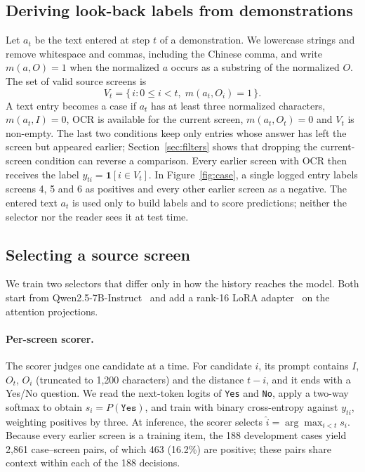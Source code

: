 \documentclass{article}
\begin{document}
\subsection{Deriving look-back labels from demonstrations}
\label{sec:labels}
Let $a_t$ be the text entered at step $t$ of a demonstration. We lowercase strings and remove whitespace and commas, including the Chinese comma, and write $m(a,O)=1$ when the normalized $a$ occurs as a substring of the normalized $O$. The set of valid source screens is
\[
V_t=\{\,i : 0\leq i<t,\; m(a_t,O_i)=1\,\}.
\]
A text entry becomes a case if $a_t$ has at least three normalized characters, $m(a_t,I)=0$, OCR is available for the current screen, $m(a_t,O_t)=0$ and $V_t$ is non-empty. The last two conditions keep only entries whose answer has left the screen but appeared earlier; Section~\ref{sec:filters} shows that dropping the current-screen condition can reverse a comparison. Every earlier screen with OCR then receives the label $y_{ti}=\mathbf{1}[i\in V_t]$. In Figure~\ref{fig:case}, a single logged entry labels screens 4, 5 and 6 as positives and every other earlier screen as a negative. The entered text $a_t$ is used only to build labels and to score predictions; neither the selector nor the reader sees it at test time.

\subsection{Selecting a source screen}
We train two selectors that differ only in how the history reaches the model. Both start from Qwen2.5-7B-Instruct~\citep{qwen} and add a rank-16 LoRA adapter~\citep{lora} on the attention projections.

\paragraph{Per-screen scorer.} The scorer judges one candidate at a time. For candidate $i$, its prompt contains $I$, $O_t$, $O_i$ (truncated to 1,200 characters) and the distance $t-i$, and it ends with a Yes/No question. We read the next-token logits of \texttt{Yes} and \texttt{No}, apply a two-way softmax to obtain $s_i=P(\texttt{Yes})$, and train with binary cross-entropy against $y_{ti}$, weighting positives by three. At inference, the scorer selects $\hat i=\arg\max_{i<t}s_i$. Because every earlier screen is a training item, the 188 development cases yield 2,861 case--screen pairs, of which 463 (16.2\%) are positive; these pairs share context within each of the 188 decisions.
\end{document}
